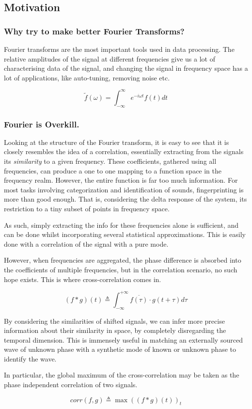 \subsection{Motivation}

\subsubsection{Why try to make better Fourier Transforms?} Fourier transforms
are the most important tools used in data processing. The relative amplitudes of
the signal at different frequencies give us a lot of characterising data of the
signal, and changing the signal in frequency space has a lot of applications,
like auto-tuning, removing noise etc. 

\begin{equation}
    \tilde{f}(\omega) = \int_{-\infty}^{\infty} e^{-i\omega t}f(t) dt
\end{equation}

\subsubsection{Fourier is Overkill.}
Looking at the structure of the Fourier transform, it is easy to see that it is
closely resembles the idea of a correlation, essentially extracting from the
signals its \emph{similarity} to a given frequency. These coefficients, gathered
using all frequencies, can produce a one to one mapping to a function space in
the frequency realm. However, the entire function is far too much information.
For most tasks involving categorization and identification of sounds,
fingerprinting is more than good enough. That is, considering the delta response
of the system, its restriction to a tiny subset of points in frequency space.

As such, simply extracting the info for these frequencies alone is sufficient,
and can be done whilst incorporating several statistical approximations. This is
easily done with a correlation of the signal with a pure mode. 

However, when frequencies are aggregated, the phase difference is absorbed into
the coefficients of multiple frequencies, but in the correlation scenario, no
such hope exists. This is where cross-correlation comes in. 

\begin{equation}
    (f \ast g)(t) \triangleq \int_{-\infty}^{+\infty} \overline{f(\tau)} \cdot g(t+\tau) d\tau
\end{equation}

By considering the similarities of shifted signals, we can infer more precise
information about their similarity in space, by completely disregarding the
temporal dimension. This is immensely useful in matching an externally sourced
wave of unknown phase with a synthetic mode of known or unknown phase to
identify the wave.

In particular, the global maximum of the cross-correlation may be taken as the
phase independent correlation of two signals.

\begin{equation}
    corr(f, g) \triangleq \max((f \ast g) (t))_t
\end{equation}
